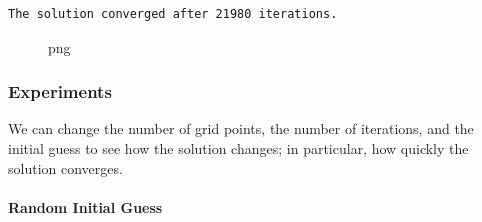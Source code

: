 \begin{verbatim}
The solution converged after 21980 iterations.
\end{verbatim}

\begin{figure}
\centering
{}
\caption{png}
\end{figure}

\subsubsection{Experiments}\label{experiments}

We can change the number of grid points, the number of iterations, and
the initial guess to see how the solution changes; in particular, how
quickly the solution converges.

\paragraph{Random Initial Guess}\label{random-initial-guess}

\begin{Shaded}
\begin{Highlighting}[]
\OperatorTok{=}  
\OperatorTok{=}
\OperatorTok{=}  
\OperatorTok{=}  

\NormalTok{arr[}\NormalTok{] }\OperatorTok{=}  
\NormalTok{arr[}\OperatorTok{{-}}\NormalTok{] }\OperatorTok{=}  

\OperatorTok{=}
\OperatorTok{;}
\end{Highlighting}
\end{Shaded}

